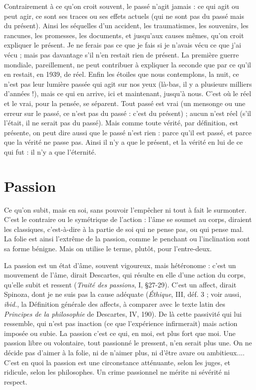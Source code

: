 Contrairement à ce qu’on croit souvent, le passé n’agit jamais : ce qui agit
ou peut agir, ce sont ses traces ou ses effets actuels (qui ne sont pas du passé
mais du présent). Ainsi les séquelles d’un accident, les traumatismes, les souvenirs,
les rancunes, les promesses, les documents, et jusqu'aux causes
mêmes, qu'on croit expliquer le présent. Je ne ferais pas ce que je fais si je
n'avais vécu ce que j'ai vécu ; mais pas davantage s’il n’en restait rien de présent.
La première guerre mondiale, pareillement, ne peut contribuer à expliquer
la seconde que par ce qu’il en restait, en 1939, de réel. Enfin les étoiles
que nous contemplons, la nuit, ce n’est pas leur lumière passée qui agit sur
nos yeux (là-bas, il y a plusieurs milliers d'années !), mais ce qui en arrive, ici
et maintenant, jusqu’à nous. C’est où le réel et le vrai, pour la pensée, se séparent.
Tout passé est vrai (un mensonge ou une erreur sur le passé, ce n’est pas
du passé : c’est du présent) ; aucun n’est réel (s’il l'était, il ne serait pas du
passé). Mais comme toute vérité, par définition, est présente, on peut dire
aussi que le passé n’est rien : parce qu’il est passé, et parce que la vérité ne
passe pas. Ainsi il n’y a que le présent, et la vérité en lui de ce qui fut : il n’y
a que l'éternité.

\section{Passion}
Ce qu’on subit, mais en soi, sans pouvoir l'empêcher ni tout à fait
le surmonter. C’est le contraire ou le symétrique de l’action :
l’âme se soumet au corps, diraient les classiques, c’est-à-dire à la partie de soi
qui ne pense pas, ou qui pense mal. La folie est ainsi l'extrême de la passion,
comme le penchant ou l’inclination sont sa forme bénigne. Mais on utilise le
terme, plutôt, pour l’entre-deux.

La passion est un état d'âme, souvent vigoureux, mais hétéronome : c’est
un mouvement de l’âme, dirait Descartes, qui résulte en elle d’une action du
corps, qu’elle subit et ressent ({\it Traité des passions}, I, \S 27-29). C’est un affect,
dirait Spinoza, dont je ne suis pas la cause adéquate ({\it Éthique}, III, déf. 3 ; voir
aussi, {\it ibid.}, la Définition générale des affects, à comparer avec le texte latin des
{\it Principes de la philosophie} de Descartes, IV, 190). De là cette passivité qui lui
ressemble, qui n’est pas inaction (ce que l’expérience infirmerait) mais action
imposée ou subie. La passion c’est ce qui, en moi, est plus fort que moi. Une
passion libre ou volontaire, tout passionné le pressent, n’en serait plus une. On
ne décide pas d’aimer à la folie, ni de n’aimer plus, ni d’être avare ou ambitieux....
C’est en quoi la passion est une circonstance atténuante, selon les
juges, et ridicule, selon les philosophes. Un crime passionnel ne mérite ni sévérité
ni respect.

